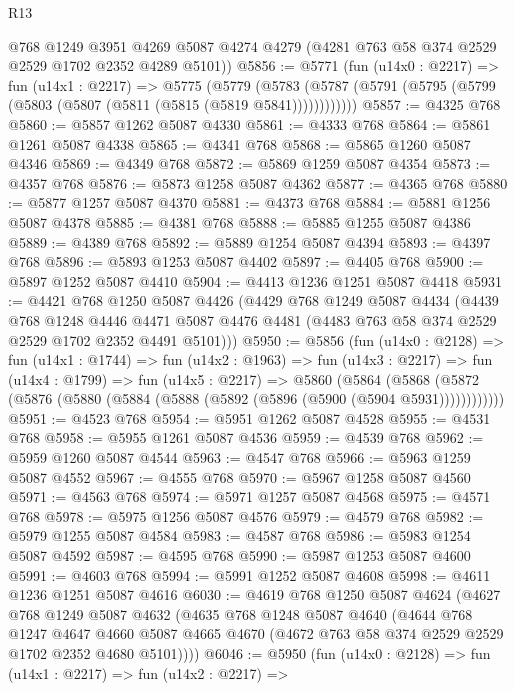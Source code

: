 \begin{lexlean}{R13}
\begin{coremodule}
      @768
      @1249
      @3951
      @4269
      @5087
      @4274
      @4279
      (@4281 @763 @58 @374 @2529 @2529 @1702 @2352 @4289 @5101))
@5856 := @5771
    (fun (u14x0 : @2217) =>
    fun (u14x1 : @2217) =>
    @5775
      (@5779 (@5783 (@5787 (@5791 (@5795 (@5799 (@5803 (@5807 (@5811 (@5815 (@5819 @5841))))))))))))
@5857 := @4325 @768
@5860 := @5857 @1262 @5087 @4330
@5861 := @4333 @768
@5864 := @5861 @1261 @5087 @4338
@5865 := @4341 @768
@5868 := @5865 @1260 @5087 @4346
@5869 := @4349 @768
@5872 := @5869 @1259 @5087 @4354
@5873 := @4357 @768
@5876 := @5873 @1258 @5087 @4362
@5877 := @4365 @768
@5880 := @5877 @1257 @5087 @4370
@5881 := @4373 @768
@5884 := @5881 @1256 @5087 @4378
@5885 := @4381 @768
@5888 := @5885 @1255 @5087 @4386
@5889 := @4389 @768
@5892 := @5889 @1254 @5087 @4394
@5893 := @4397 @768
@5896 := @5893 @1253 @5087 @4402
@5897 := @4405 @768
@5900 := @5897 @1252 @5087 @4410
@5904 := @4413 @1236 @1251 @5087 @4418
@5931 := @4421
    @768
    @1250
    @5087
    @4426
    (@4429
      @768
      @1249
      @5087
      @4434
      (@4439
        @768
        @1248
        @4446
        @4471
        @5087
        @4476
        @4481
        (@4483 @763 @58 @374 @2529 @2529 @1702 @2352 @4491 @5101)))
@5950 := @5856
    (fun (u14x0 : @2128) =>
    fun (u14x1 : @1744) =>
    fun (u14x2 : @1963) =>
    fun (u14x3 : @2217) =>
    fun (u14x4 : @1799) =>
    fun (u14x5 : @2217) =>
    @5860
      (@5864 (@5868 (@5872 (@5876 (@5880 (@5884 (@5888 (@5892 (@5896 (@5900 (@5904 @5931))))))))))))
@5951 := @4523 @768
@5954 := @5951 @1262 @5087 @4528
@5955 := @4531 @768
@5958 := @5955 @1261 @5087 @4536
@5959 := @4539 @768
@5962 := @5959 @1260 @5087 @4544
@5963 := @4547 @768
@5966 := @5963 @1259 @5087 @4552
@5967 := @4555 @768
@5970 := @5967 @1258 @5087 @4560
@5971 := @4563 @768
@5974 := @5971 @1257 @5087 @4568
@5975 := @4571 @768
@5978 := @5975 @1256 @5087 @4576
@5979 := @4579 @768
@5982 := @5979 @1255 @5087 @4584
@5983 := @4587 @768
@5986 := @5983 @1254 @5087 @4592
@5987 := @4595 @768
@5990 := @5987 @1253 @5087 @4600
@5991 := @4603 @768
@5994 := @5991 @1252 @5087 @4608
@5998 := @4611 @1236 @1251 @5087 @4616
@6030 := @4619
    @768
    @1250
    @5087
    @4624
    (@4627
      @768
      @1249
      @5087
      @4632
      (@4635
        @768
        @1248
        @5087
        @4640
        (@4644
          @768
          @1247
          @4647
          @4660
          @5087
          @4665
          @4670
          (@4672 @763 @58 @374 @2529 @2529 @1702 @2352 @4680 @5101))))
@6046 := @5950
    (fun (u14x0 : @2128) =>
    fun (u14x1 : @2217) =>
    fun (u14x2 : @2217) =>

\end{coremodule}
\end{lexlean}
